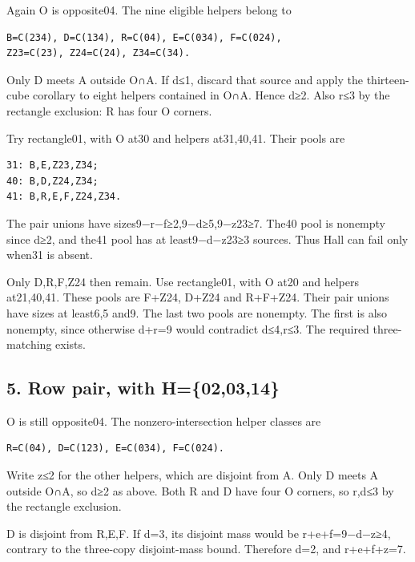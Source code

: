 \documentclass[
  10pt,
]{article}
\begin{document}
Again O is opposite04. The nine eligible helpers belong to

\begin{verbatim}
B=C(234), D=C(134), R=C(04), E=C(034), F=C(024),
Z23=C(23), Z24=C(24), Z34=C(34).
\end{verbatim}

Only D meets A outside O∩A. If d≤1, discard that source and apply the
thirteen-cube corollary to eight helpers contained in O∩A. Hence d≥2.
Also r≤3 by the rectangle exclusion: R has four O corners.

Try rectangle01, with O at30 and helpers at31,40,41. Their
pools are

\begin{verbatim}
31: B,E,Z23,Z34;
40: B,D,Z24,Z34;
41: B,R,E,F,Z24,Z34.
\end{verbatim}

The pair unions have sizes9−r−f≥2,9−d≥5,9−z23≥7. The40 pool is nonempty
since d≥2, and the41 pool has at least9−d−z23≥3 sources. Thus Hall can
fail only when31 is absent.

Only D,R,F,Z24 then remain. Use rectangle01, with O at20 and
helpers at21,40,41. These pools are F+Z24, D+Z24 and R+F+Z24. Their pair
unions have sizes at least6,5 and9. The last two pools are nonempty. The
first is also nonempty, since otherwise d+r=9 would contradict d≤4,r≤3.
The required three-matching exists.

\hypertarget{row-pair-with-h020314-1}{%
\subsection*{5. Row pair, with
H=\{02,03,14\}}\label{row-pair-with-h020314-1}}

O is still opposite04. The nonzero-intersection helper classes
are

\begin{verbatim}
R=C(04), D=C(123), E=C(034), F=C(024).
\end{verbatim}

Write z≤2 for the other helpers, which are disjoint from A. Only D meets
A outside O∩A, so d≥2 as above. Both R and D have four O corners, so
r,d≤3 by the rectangle exclusion.

D is disjoint from R,E,F. If d=3, its disjoint mass would be
r+e+f=9−d−z≥4, contrary to the three-copy disjoint-mass bound. Therefore
d=2, and r+e+f+z=7.
\end{document}
